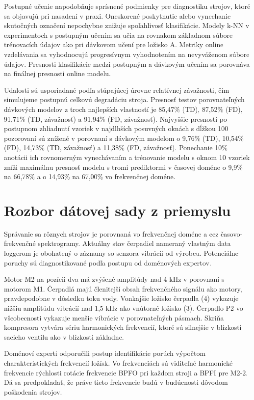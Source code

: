 Postupné učenie napodobňuje sprísnené podmienky pre diagnostiku strojov, ktoré sa objavujú pri nasadení v praxi. Oneskorené poskytnutie alebo vynechanie skutočných označení nepochybne znižuje spoľahlivosť klasifikácie. Modely k-NN v experimentoch s postupným učením sa učia na rovnakom základnom súbore trénovacích údajov ako pri dávkovom učení pre ložisko A. Metriky online vzdelávania sa vyhodnocujú progresívnym vyhodnotením na nevyváženom súbore údajov. Presnosti klasifikácie medzi postupným a dávkovým učením sa porovnáva na finálnej presnosti online modelu. 

Udalosti sú usporiadané podľa stúpajúcej úrovne relatívnej závažnosti, čím simulujeme postupnú celkovú degradáciu stroja. Presnosť testov porovnateľných dávkových modelov z troch najlepších vlastností je 85,47\% (TD), 87,52\% (FD), 91,71\% (TD, závažnosť) a 91,94\% (FD, závažnosť). Najvyššie presnosti po postupnom zhliadnutí vzoriek v najdlhších posuvných oknách s dĺžkou 100 pozorovaní sú znížené v porovnaní s dávkovým modelom o 9,76\% (TD), 10,54\% (FD), 14,73\% (TD, závažnosť) a 11,38\% (FD, závažnosť). Ponechanie 10\% anotácii ich rovnomerným vynechávaním a trénovanie modelu s oknom 10 vzoriek zníži maximálnu presnosť modelu s tromi prediktormi v časovej doméne o 9,9\% na 66,78\% a o 14,93\%  na 67,00\% vo frekvenčnej doméne.

\section{Rozbor dátovej sady z priemyslu}
Správanie sa rôznych strojov je porovnaná vo frekvenčnej doméne a cez časovo-frekvenčné spektrogramy. Aktuálny stav čerpadiel nameraný vlastným data loggerom je obohatený o záznamy so senzora vibrácii od výrobcu. Potenciálne poruchy sú diagnostikované podľa postupu od doménových expertov. 

Motor M2 na pozícii dva má zvýšené amplitúdy nad 4 kHz v porovnaní s motorom M1. Čerpadlá majú členitejší obsah frekvenčného signálu ako motory, pravdepodobne v dôsledku toku vody. Vonkajšie ložisko čerpadla (4) vykazuje nižšiu amplitúdu vibrácií nad 1,5 kHz ako vnútorné ložisko (3). Čerpadlo P2 vo všeobecnosti vykazuje menšie vibrácie v porovnateľných pásmach. Skriňa kompresora vytvára sériu harmonických frekvencií, ktoré sú silnejšie v blízkosti sacieho ventilu ako v blízkosti základne.

Doménoví experti odporučili postup identifikácie porúch výpočtom charakteristických frekvencií ložísk. Vo frekvenciách sú viditeľné harmonické frekvencie rýchlosti rotácie frekvencie BPFO pri každom stroji a BPFI pre M2-2. Dá sa predpokladať, že práve tieto frekvencie budú v budúcnosti dôvodom poškodenia strojov.

